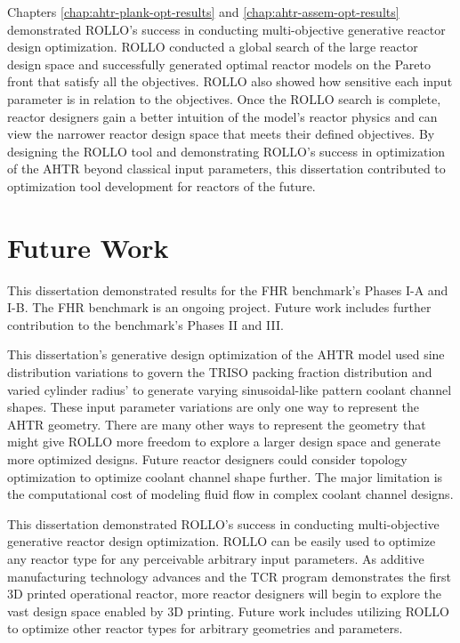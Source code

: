 Chapters \ref{chap:ahtr-plank-opt-results} and \ref{chap:ahtr-assem-opt-results} 
demonstrated \gls{ROLLO}'s success in conducting multi-objective generative reactor 
design optimization. 
\gls{ROLLO} conducted a global search of the large reactor design space and successfully 
generated optimal reactor models on the Pareto front that satisfy all the objectives. 
\gls{ROLLO} also showed how sensitive each input parameter is in relation to 
the objectives. 
Once the \gls{ROLLO} search is complete, reactor designers gain a better intuition of 
the model's reactor physics and can view the narrower reactor design space that meets 
their defined objectives.   
By designing the \gls{ROLLO} tool and demonstrating \gls{ROLLO}'s success in 
optimization of the \gls{AHTR} beyond classical input parameters, this dissertation 
contributed to optimization tool development for reactors of the future. 

\section{Future Work}
This dissertation demonstrated results for the \gls{FHR} benchmark's Phases I-A and I-B.
The \gls{FHR} benchmark is an ongoing project. 
Future work includes further contribution to the benchmark's Phases II and III. 

This dissertation's generative design optimization of the \gls{AHTR} model used sine 
distribution variations to govern the \gls{TRISO} packing fraction distribution and  
varied cylinder radius' to generate varying sinusoidal-like pattern coolant channel 
shapes. 
These input parameter variations are only one way to represent the \gls{AHTR} 
geometry. 
There are many other ways to represent the geometry that might give \gls{ROLLO} more 
freedom to explore a larger design space and generate more optimized designs. 
Future reactor designers could consider topology optimization to optimize coolant 
channel shape further.
The major limitation is the computational cost of modeling fluid flow in complex 
coolant channel designs. 

This dissertation demonstrated \gls{ROLLO}'s success in conducting multi-objective 
generative reactor design optimization. 
\gls{ROLLO} can be easily used to optimize any reactor type for any perceivable 
arbitrary input parameters. 
As additive manufacturing technology advances and the \gls{TCR} program 
demonstrates the first 3D printed operational reactor, more reactor designers 
will begin to explore the vast design space enabled by 3D printing. 
Future work includes utilizing \gls{ROLLO} to optimize other reactor types for arbitrary
geometries and parameters. 

